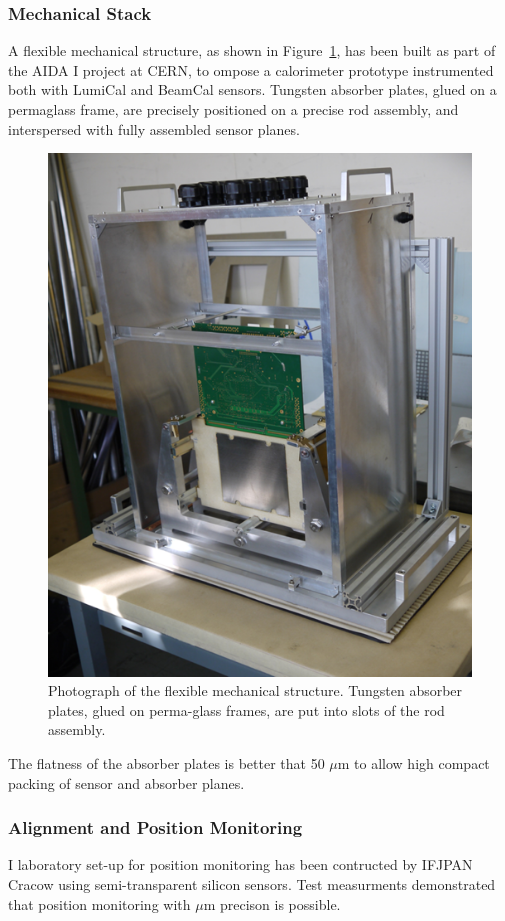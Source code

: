 \subsubsection{Mechanical Stack}

A flexible mechanical structure, as shown in  Figure~\ref{fig:mechanical_structure}, has been built as part of the AIDA I project at CERN,
to ompose a calorimeter prototype instrumented both with LumiCal and BeamCal sensors. Tungsten absorber plates, glued on a permaglass
frame, are precisely
positioned on a precise rod assembly, and interspersed with fully assembled sensor planes.
\begin{figure}[h!]
\centering
\includegraphics[width=0.6\columnwidth,]{Calorimeter/FCAL/figs/mechanical_structure_2}
\caption{Photograph of the flexible mechanical structure. Tungsten absorber plates, glued on perma-glass frames, are put into slots of the
rod assembly.}
\label{fig:mechanical_structure}
\end{figure}
The flatness of the absorber plates is better that 50 $\mu$m to allow high compact packing of sensor and absorber planes.

\subsubsection{Alignment and Position Monitoring }

I laboratory set-up for position monitoring has been contructed by IFJPAN Cracow using semi-transparent
silicon sensors. Test measurments demonstrated that position monitoring with $\mu$m precison is possible.

